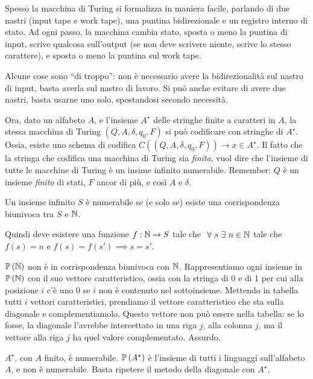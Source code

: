 Spesso la macchina di Turing si formalizza in maniera facile, parlando di due nastri (input tape e work tape), una puntina bidirezionale e un registro interno di stato. Ad ogni passo, la macchina cambia stato, sposta o meno la puntina di input, scrive qualcosa sull'output (se non deve scrivere niente, scrive lo stesso carattere), e sposta o meno la puntina sul work tape.

Alcune cose sono ``di troppo'': non \`e necessario avere la bidirezionalit\`a sul nastro di input, basta averla sul nastro di lavoro. Si pu\`o anche evitare di avere due nastri, basta usarne uno solo, spostandosi secondo necessit\`a.

Ora, dato un alfabeto $A$, e l'insieme $A^{\star}$ delle stringhe finite a caratteri in $A$, la stessa macchina di Turing $(Q, A, \delta, q_0, F)$ si pu\`o codificare con stringhe di $A^{\star}$. Ossia, esiste uno schema di codifica $C((Q, A, \delta, q_0, F)) \to x \in A^{\star}$. Il fatto che la stringa che codifica una macchina di Turing sia \emph{finita}, vuol dire che l'insieme di tutte le macchine di Turing \`e un insime infinito numerabile. Remember: $Q$ \`e un insieme \emph{finito} di stati, $F$ ancor di pi\`u, e cos\`i $A$ e $\delta$.

\begin{defn}
Un insieme infinito $S$ \`e numerabile se (e solo se) esiste una corrispondenza biunivoca tra $S$ e $\mathbb{N}$.
\end{defn}
Quindi deve esistere una funzione $f : \mathbb{N} \to S$ tale che $\forall s \exists n \in \naturals$ tale che $f(s) = n$ e $f(s) = f(s') \implies s = s'$.

$\mathbb{P} \left( {\mathbb{N}} \right)$ non \`e in corrispondenza biunivoca con $\mathbb{N}$. Rappresentiamo ogni insieme in $\mathbb{P} \left( {\mathbb{N}} \right)$ con il suo vettore caratteristico, ossia con la stringa di 0 e di 1 per cui alla posizione $i$ c'\`e uno 0 se $i$ non \`e contenuto nel sottoinsieme. Mettendo in tabella tutti $i$ vettori caratteristici, prendiamo il vettore caratteristico che sta sulla diagonale e complementiamolo. Questo vettore non pu\`o essere nella tabella: se lo fosse, la diagonale l'avrebbe intercettato in una riga $j$, alla colonna $j$, ma il vettore alla riga $j$ ha quel valore complementato. Assurdo.

$A^{\star}$, con $A$ finito, \`e numerabile. $\mathbb{P} \left( {A^{\star}} \right)$ \`e l'insieme di tutti i linguaggi sull'alfabeto $A$, e non \`e numerabile. Basta ripetere il metodo della diagonale con $A^{\star}$.

